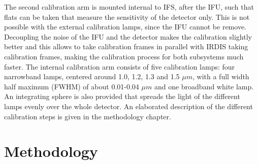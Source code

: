 \documentclass[twoside,single,12pt]{lion-msc}
\begin{document}
The second calibration arm is mounted internal to IFS, after the IFU, such that flats can be taken that measure the sensitivity of the detector only. This is not possible with the external calibration lamps, since the IFU cannot be remove. Decoupling the noise of the IFU and the detector makes the calibration slightly better and this allows to take calibration frames in parallel with IRDIS taking calibration frames, making the calibration process for both subsystems much faster. The internal calibration arm consists of five calibration lamps: four narrowband lamps, centered around 1.0, 1.2, 1.3 and 1.5 $\mu m$, with a full width half maximum (FWHM) of about 0.01-0.04 $\mu m$ and one broadband white lamp\citep{Desidera2008}. An integrating sphere is also provided that spreads the light of the different lamps evenly over the whole detector. An elaborated description of the different calibration steps is given in the methodology chapter.

\chapter{Methodology}
\end{document}

